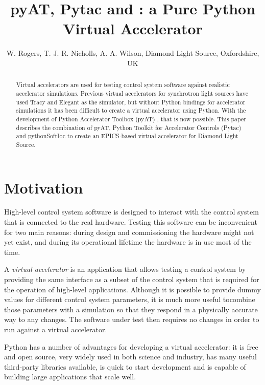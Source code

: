 \documentclass[a4paper,
               keeplastbox,   %
               ]{jacow}
\begin{document}
\title{pyAT, Pytac and : a Pure Python Virtual Accelerator} 

\author{W. Rogers, T. J. R. Nicholls, A. A. Wilson, Diamond Light Source, Oxfordshire, UK}
	
\maketitle

\begin{abstract}
Virtual accelerators are used for testing control system software against
realistic accelerator simulations. Previous virtual accelerators for 
synchrotron light sources have used Tracy \cite{tracy} and Elegant \cite{elegant} as the simulator,
but without Python bindings for accelerator simulations it has been difficult 
to create a virtual accelerator using Python. With the development of 
Python Accelerator Toolbox (pyAT) \cite{pyat}, that is now possible. This paper 
describes the combination of pyAT, Python Toolkit for Accelerator Controls 
(Pytac) and pythonSoftIoc to create an EPICS-based virtual accelerator for 
Diamond Light Source.
\end{abstract}

\section{Motivation}

High-level control system software is designed to interact with the control system
that is connected to the real hardware. Testing this software can be inconvenient
for two main reasons: during design and commissioning the hardware might not
yet exist, and during its operational lifetime the hardware is in use most of
the time.

A \textit{virtual accelerator} is an application that allows testing a control
system by providing the same interface as a subset of the control system that 
is required for the operation of high-level applications. Although it is possible
to provide dummy values for different control system parameters, it is much more 
useful tocombine those parameters with a simulation so that they respond in a 
physically accurate way to any changes. The software under test then requires no 
changes in order to run against a virtual accelerator.

Python has a number of advantages for developing a virtual accelerator:
it is free and open source, very widely used in both science and industry,
has many useful third-party libraries available, is quick to start development
and is capable of building large applications that scale well.
\end{document}
